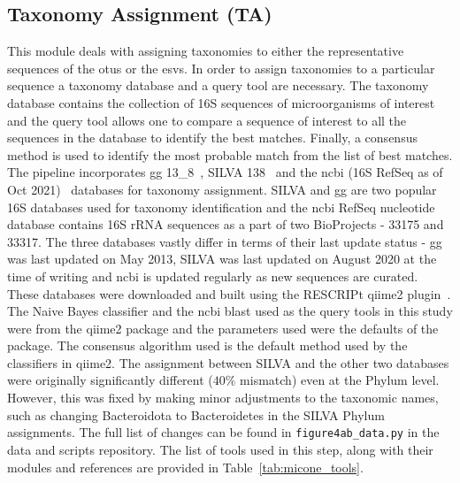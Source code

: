   \subsection*{Taxonomy Assignment (TA)}
  \vspace{-5mm}
  This module deals with assigning taxonomies to either the representative sequences of the \ac{otu}s or the \ac{esv}s.
  In order to assign taxonomies to a particular sequence a taxonomy database and a query tool are necessary.
  The taxonomy database contains the collection of 16S sequences of microorganisms of interest and the query tool allows one to compare a sequence of interest to all the sequences in the database to identify the best matches.
  Finally, a consensus method is used to identify the most probable match from the list of best matches.
  The pipeline incorporates \ac{gg} 13\_8~\cite{DeSantis2006}, SILVA 138~\cite{Quast2012} and the \ac{ncbi} (16S RefSeq as of Oct 2021)~\cite{Sayers2009} databases for taxonomy assignment.
  SILVA and \ac{gg} are two popular 16S databases used for taxonomy identification and the \ac{ncbi} RefSeq nucleotide database contains 16S rRNA sequences as a part of two BioProjects - 33175 and 33317.
  The three databases vastly differ in terms of their last update status - \ac{gg} was last updated on May 2013, SILVA was last updated on August 2020 at the time of writing and \ac{ncbi} is updated regularly as new sequences are curated.
  These databases were downloaded and built using the RESCRIPt \ac{qiime2} plugin~\cite{iiRESCRIPtReproducibleSequence2021}.
  The Naive Bayes classifier and the \ac{ncbi} blast used as the query tools in this study were from the \ac{qiime2} package and the parameters used were the defaults of the package.
  The consensus algorithm used is the default method used by the classifiers in \ac{qiime2}.
  The assignment between SILVA and the other two databases were originally significantly different ($40\%$ mismatch) even at the Phylum level.
  However, this was fixed by making minor adjustments to the taxonomic names, such as changing Bacteroidota to Bacteroidetes in the SILVA Phylum assignments.
  The full list of changes can be found in \texttt{figure4ab\_data.py} in the data and scripts  repository.
  The list of tools used in this step, along with their modules and references are provided in Table~\ref{tab:micone_tools}.

